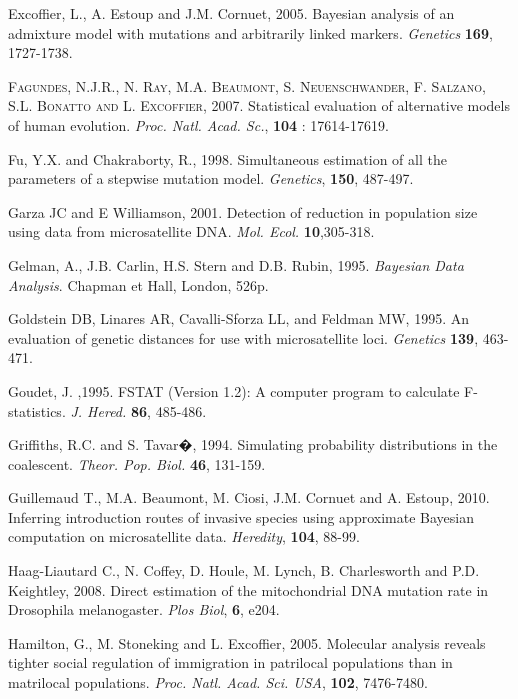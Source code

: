 \begin{thebibliography}{a}
 Excoffier, L., A.
Estoup and J.M. Cornuet, 2005. Bayesian analysis of an admixture model
with mutations and arbitrarily linked markers. \emph{Genetics} \textbf{169},
1727-1738.

 \textsc{Fagundes, N.J.R.,
N. Ray, M.A. Beaumont, S. Neuenschwander, F. Salzano, S.L. Bonatto
and L. Excoffier}, 2007. Statistical evaluation of alternative models
of human evolution. \emph{Proc. Natl. Acad. Sc.}, \textbf{104} : 17614-17619.

 Fu, Y.X. and Chakraborty,
R., 1998. Simultaneous estimation of all the parameters of a stepwise
mutation model. \emph{Genetics}, \textbf{150}, 487-497.

 Garza JC and E Williamson,
2001. Detection of reduction in population size using data from microsatellite
DNA. \emph{Mol. Ecol.} \textbf{10},305-318.

 Gelman, A., J.B. Carlin,
H.S. Stern and D.B. Rubin, 1995. \emph{Bayesian Data Analysis}. Chapman
et Hall, London, 526p.

 Goldstein DB, Linares
AR, Cavalli-Sforza LL, and Feldman MW, 1995. An evaluation of genetic
distances for use with microsatellite loci. \emph{Genetics} \textbf{139},
463-471.

 Goudet, J. ,1995. FSTAT (Version 1.2):
A computer program to calculate F- statistics. \emph{J. Hered.} \textbf{86},
485-486.

 Griffiths, R.C. and
S. Tavar�, 1994. Simulating probability distributions in the coalescent.
\emph{Theor. Pop. Biol.} \textbf{46}, 131-159.

Guillemaud T., M.A.
Beaumont, M. Ciosi, J.M. Cornuet and A. Estoup, 2010. Inferring introduction
routes of invasive species using approximate Bayesian computation
on microsatellite data. \emph{Heredity}, \textbf{104}, 88-99.

 Haag-Liautard
C., N. Coffey, D. Houle, M. Lynch, B. Charlesworth and P.D. Keightley,
2008. Direct estimation of the mitochondrial DNA mutation rate in
Drosophila melanogaster. \emph{Plos Biol}, \textbf{6}, e204.

 Hamilton, G., M. Stoneking
and L. Excoffier, 2005. Molecular analysis reveals tighter social
regulation of immigration in patrilocal populations than in matrilocal
populations. \emph{Proc. Natl. Acad. Sci. USA}, \textbf{102}, 7476-7480.


\end{thebibliography}
